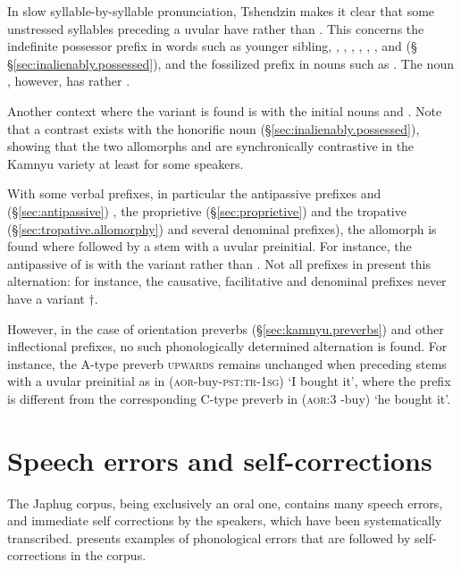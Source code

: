 In slow syllable-by-syllable pronunciation, Tshendzin makes it clear that some unstressed syllables preceding a uvular have  rather than . This concerns the indefinite possessor prefix in words such as  {younger sibling}, , , , , , ,  and  (§ §\ref{sec:inalienably.possessed}), and the fossilized prefix in nouns such as . The noun , however, has  rather .

Another context where the variant  is found is with the  initial nouns  and . Note that a contrast exists with the honorific noun  (§\ref{sec:inalienably.possessed}), showing that the two allomorphs  and  are synchronically contrastive in the Kamnyu variety at least for some speakers.

With some verbal prefixes, in particular the antipassive prefixes  and  (§\ref{sec:antipassive}) , the proprietive  (§\ref{sec:proprietive}) and the tropative  (§\ref{sec:tropative.allomorphy}) and several denominal prefixes), the  allomorph is found where followed by a stem with a uvular preinitial. For instance, the antipassive of  is  with the variant  rather than . Not all prefixes in  present this alternation: for instance, the causative, facilitative and denominal prefixes  never have a variant $\dagger$.

However, in the case of orientation preverbs (§\ref{sec:kamnyu.preverbs}) and other inflectional prefixes, no such phonologically determined alternation is found. For instance, the A-type preverb  \textsc{upwards} remains unchanged when preceding stems with a uvular preinitial as in  (\textsc{aor}-buy-\textsc{pst}:\textsc{tr}-\textsc{1sg}) `I bought it', where the prefix  is different from the corresponding C-type preverb  in  (\textsc{aor}:3 \flobv{}-buy) `he bought it'.

\section{Speech errors and self-corrections} \label{sec:self.corrections}
The Japhug corpus, being exclusively an oral one, contains many speech errors, and immediate self corrections by the speakers, which have been systematically transcribed.  presents examples of phonological errors that are followed by self-corrections in the corpus.

